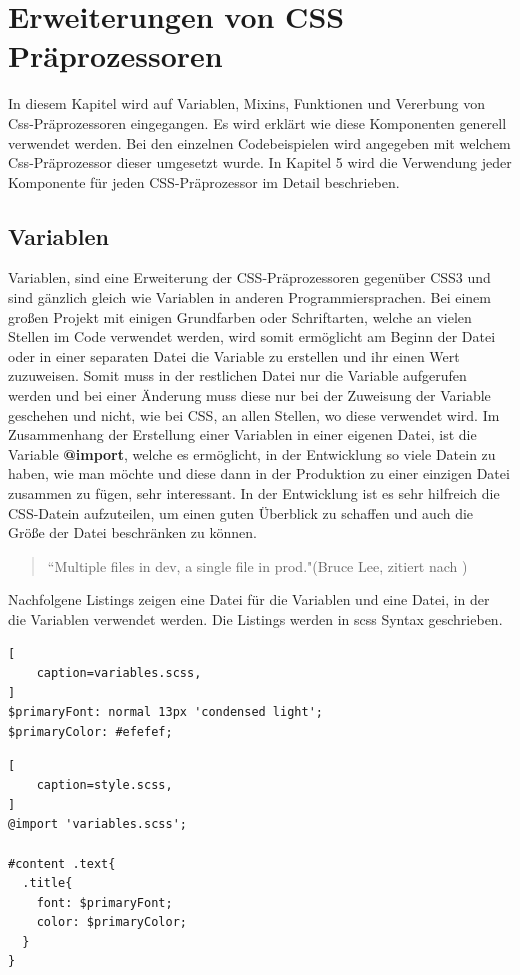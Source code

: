 \section{Erweiterungen von CSS Präprozessoren}
In diesem Kapitel wird auf Variablen, Mixins, Funktionen und Vererbung von Css-Präprozessoren eingegangen. Es wird erklärt wie diese Komponenten generell verwendet werden. Bei den einzelnen Codebeispielen wird angegeben mit welchem Css-Präprozessor dieser umgesetzt wurde. In Kapitel 5 wird die Verwendung jeder Komponente für jeden CSS-Präprozessor im Detail beschrieben.
\subsection{Variablen}
Variablen, sind eine Erweiterung der CSS-Präprozessoren gegenüber CSS3 und sind gänzlich gleich wie Variablen in anderen Programmiersprachen.
Bei einem großen Projekt mit einigen Grundfarben oder Schriftarten, welche an vielen Stellen im Code verwendet werden, wird somit ermöglicht am Beginn der Datei oder in einer separaten Datei die Variable zu erstellen und ihr einen Wert zuzuweisen. Somit muss in der restlichen Datei nur die Variable aufgerufen werden und bei einer Änderung muss diese nur bei der Zuweisung der Variable geschehen und nicht, wie bei CSS, an allen Stellen, wo diese verwendet wird.\autocite[]{Yard.2014} \newline
Im Zusammenhang der Erstellung einer Variablen in einer eigenen Datei, ist die Variable \textbf{@import}, welche es ermöglicht, in der Entwicklung so viele Datein zu haben, wie man möchte und diese dann in der Produktion zu einer einzigen Datei zusammen zu fügen, sehr interessant\autocite[]{Giraudel.2014}.\newline
In der Entwicklung ist es sehr hilfreich die CSS-Datein aufzuteilen, um einen guten Überblick zu schaffen und auch die Größe der Datei beschränken zu können.
\begin{quote}
``Multiple files in dev, a single file in prod."(Bruce Lee, zitiert nach \cite[]{Giraudel.2014b})
\end{quote}

Nachfolgene Listings zeigen eine Datei für die Variablen und eine Datei, in der die Variablen verwendet werden. Die Listings werden in scss Syntax geschrieben.
\begin{lstlisting}[
	caption=variables.scss,
]
$primaryFont: normal 13px 'condensed light';
$primaryColor: #efefef;
\end{lstlisting}
\begin{lstlisting}[
	caption=style.scss,
]
@import 'variables.scss';

#content .text{
  .title{
    font: $primaryFont;
    color: $primaryColor;
  }
}
\end{lstlisting}

